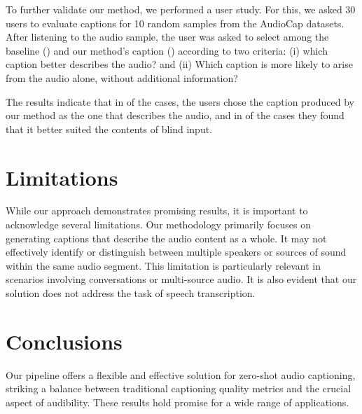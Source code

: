 \documentclass{article}
\begin{document}
To further validate our method, we performed a user study. For this, we asked 30 users to evaluate captions for 10 random samples from the AudioCap datasets. After listening to the audio sample, the user was asked to select among the baseline () and our method's caption () according to two criteria: (i) which caption better describes the audio? and (ii) Which caption is more likely to arise from the audio alone, without additional information? 

The results indicate that in  of the cases, the users chose the caption produced by our method as the one that describes the audio, and in  of the cases they found that it better suited the contents of blind input.















\section{Limitations}
While our approach demonstrates promising results, it is important to acknowledge several limitations. Our methodology primarily focuses on generating captions that describe the audio content as a whole. It may not effectively identify or distinguish between multiple speakers or sources of sound within the same audio segment. This limitation is particularly relevant in scenarios involving conversations or multi-source audio. It is also evident that our solution does not address the task of speech transcription.








\section{Conclusions}
Our pipeline offers a flexible and effective solution for zero-shot audio captioning, striking a balance between traditional captioning quality metrics and the crucial aspect of audibility. These results hold promise for a wide range of applications.



\end{document}
